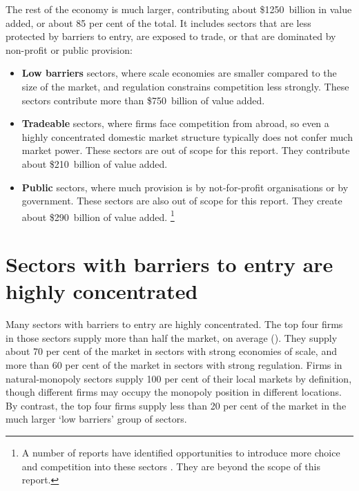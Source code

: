 The rest of the economy is much larger, contributing about \$1250~billion in value added, or about 85 per cent of the total. It includes sectors that are less protected by barriers to entry, are exposed to trade, or that are dominated by non-profit or public provision:
\begin{itemize}
    \item \textbf{Low barriers} sectors, where scale economies are smaller compared to the size of the market, and regulation constrains competition less strongly. These sectors contribute more than \$750~billion of value added.
    \item \textbf{Tradeable} sectors, where firms face competition from abroad, so even a highly concentrated domestic market structure typically does not confer much market power. These  sectors are out of scope for this report. They contribute about \$210~billion of value added.
    \item \textbf{Public} sectors, where much provision is by not-for-profit organisations or by government. These sectors are also out of scope for this report. They create about \$290~billion of value added.%
\footnote{A number of reports have identified opportunities to introduce more choice and competition into these sectors \parencites{Harper2015Competition}{PC-shiftthedial-2017}. They are beyond the scope of this report.}
\end{itemize}



\section{Sectors with barriers to entry are highly concentrated}

Many sectors with barriers to entry are highly concentrated. The top four firms in those sectors supply more than half the market, on average (). They supply about 70 per cent of the market in sectors with strong economies of scale, and more than 60 per cent of the market in sectors with strong regulation.
Firms in natural-monopoly sectors supply 100 per cent of their local markets by definition, though different firms may occupy the monopoly position in different locations. By contrast, the top four firms supply less than 20 per cent of the market in the much larger `low barriers' group of sectors.

